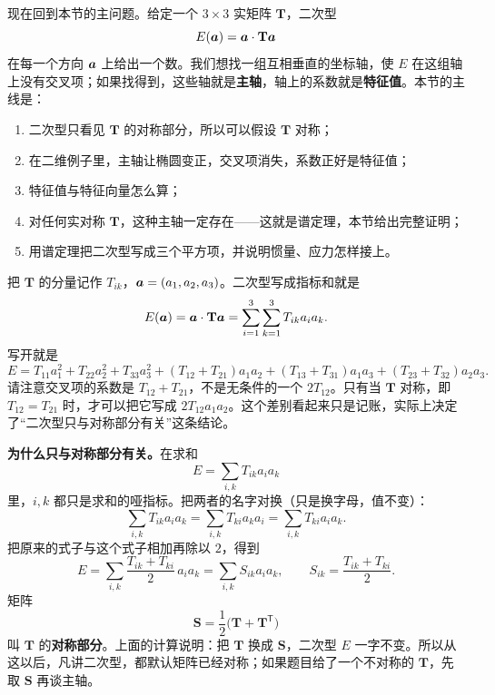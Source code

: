 \documentclass[11pt]{ctexart}
\newcommand{\ten}[1]{\mathbf{#1}}
\let\orighdr\hdr
\renewcommand{\hdr}[2]{\par\needspace{10\baselineskip}\orighdr{#1}{#2}}
\let\origsubhdr\subhdr
\renewcommand{\subhdr}[1]{\par\needspace{3\baselineskip}\origsubhdr{#1}}
\begin{document}
\begin{center}
\end{center}


现在回到本节的主问题。给定一个 $3\times3$ 实矩阵 $\ten T$，二次型
\[
E(\vect a)=\vect a\cdot\ten T\vect a
\]
在每一个方向 $\boldsymbol{a}$ 上给出一个数。我们想找一组互相垂直的坐标轴，使 $E$ 在这组轴上没有交叉项；如果找得到，这些轴就是\textbf{主轴}，轴上的系数就是\textbf{特征值}。本节的主线是：

\begin{enumerate}[label=\arabic*.,leftmargin=1.8em,itemsep=2pt]
\item 二次型只看见 $\ten T$ 的对称部分，所以可以假设 $\ten T$ 对称；
\item 在二维例子里，主轴让椭圆变正，交叉项消失，系数正好是特征值；
\item 特征值与特征向量怎么算；
\item 对任何实对称 $\ten T$，这种主轴一定存在——这就是谱定理，本节给出完整证明；
\item 用谱定理把二次型写成三个平方项，并说明惯量、应力怎样接上。
\end{enumerate}


把 $\ten T$ 的分量记作 $T_{ik}$，$\boldsymbol{a}=(a_1,a_2,a_3)$。二次型写成指标和就是
\[
E(\vect a)=\vect a\cdot\ten T\vect a
=\sum_{i=1}^{3}\sum_{k=1}^{3}T_{ik}a_ia_k .
\]
写开就是
\[
E=T_{11}a_1^2+T_{22}a_2^2+T_{33}a_3^2
+(T_{12}+T_{21})a_1a_2
+(T_{13}+T_{31})a_1a_3
+(T_{23}+T_{32})a_2a_3 .
\]
请注意交叉项的系数是 $T_{12}+T_{21}$，不是无条件的一个 $2T_{12}$。只有当 $\ten T$ 对称，即 $T_{12}=T_{21}$ 时，才可以把它写成 $2T_{12}a_1a_2$。这个差别看起来只是记账，实际上决定了“二次型只与对称部分有关”这条结论。

\textbf{为什么只与对称部分有关。}在求和
\[
E=\sum_{i,k}T_{ik}a_ia_k
\]
里，$i,k$ 都只是求和的哑指标。把两者的名字对换（只是换字母，值不变）：
\[
\sum_{i,k}T_{ik}a_ia_k
=\sum_{i,k}T_{ki}a_ka_i
=\sum_{i,k}T_{ki}a_ia_k .
\]
把原来的式子与这个式子相加再除以 $2$，得到
\[
E=\sum_{i,k}\frac{T_{ik}+T_{ki}}{2}\,a_ia_k
=\sum_{i,k}S_{ik}a_ia_k,
\qquad
S_{ik}=\frac{T_{ik}+T_{ki}}{2}.
\]
矩阵
\[
\ten S=\frac12\bigl(\ten T+\ten T^{\mathsf T}\bigr)
\]
叫 $\ten T$ 的\textbf{对称部分}。上面的计算说明：把 $\ten T$ 换成 $\ten S$，二次型 $E$ 一字不变。所以从这以后，凡讲二次型，都默认矩阵已经对称；如果题目给了一个不对称的 $\ten T$，先取 $\ten S$ 再谈主轴。
\end{document}
